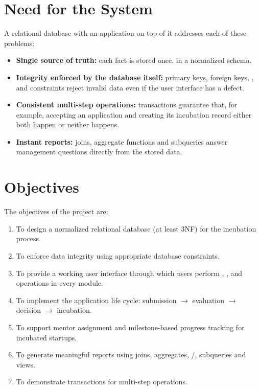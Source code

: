 \section{Need for the System}
A relational database with an application on top of it addresses each of these problems:
\begin{itemize}
  \item \textbf{Single source of truth:} each fact is stored once, in a normalized schema.
  \item \textbf{Integrity enforced by the database itself:} primary keys, foreign keys,
        ,  and  constraints reject invalid data even if
        the user interface has a defect.
  \item \textbf{Consistent multi-step operations:} transactions guarantee that, for example,
        accepting an application and creating its incubation record either both happen or
        neither happens.
  \item \textbf{Instant reports:} joins, aggregate functions and subqueries answer management
        questions directly from the stored data.
\end{itemize}

\section{Objectives}
\label{sec:objectives}
The objectives of the project are:
\begin{enumerate}
  \item To design a normalized relational database (at least 3NF) for the incubation process.
  \item To enforce data integrity using appropriate database constraints.
  \item To provide a working user interface through which users perform ,
        ,  and  operations in every module.
  \item To implement the application life cycle: submission $\rightarrow$ evaluation
        $\rightarrow$ decision $\rightarrow$ incubation.
  \item To support mentor assignment and milestone-based progress tracking for incubated
        startups.
  \item To generate meaningful reports using joins, aggregates, /,
        subqueries and views.
  \item To demonstrate transactions for multi-step operations.
\end{enumerate}

